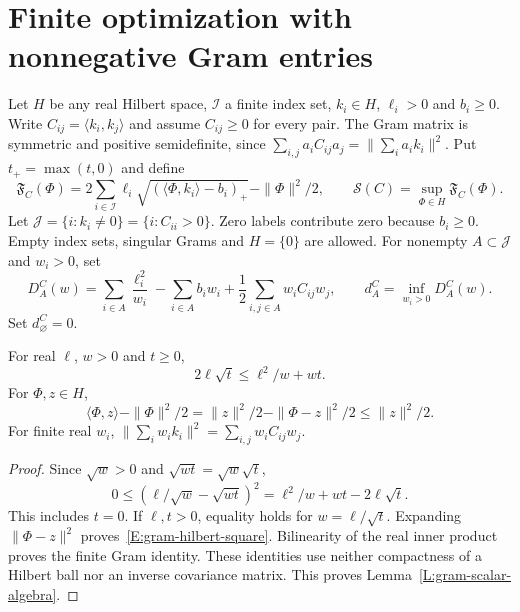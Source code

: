 \section{Finite optimization with nonnegative Gram entries}
\label{S:finite-positive-gram}

Let $H$ be any real Hilbert space, $\mathcal I$ a finite index set,
$k_i\in H$, $\ell_i>0$ and $b_i\ge0$.
Write $C_{ij}=\langle k_i,k_j\rangle$ and assume $C_{ij}\ge0$ for every
pair. The Gram matrix is symmetric and positive semidefinite, since
$\sum_{i,j}a_iC_{ij}a_j=\|\sum_i a_i k_i\|^2$.
Put $t_+=\max(t,0)$ and define
\begin{equation}\label{E:finite-gram-score}
  \mathfrak F_C(\Phi)
  =2\sum_{i\in\mathcal I}\ell_i
  \sqrt{(\langle\Phi,k_i\rangle-b_i)_+}-\|\Phi\|^2/2,
  \qquad \mathscr S(C)=\sup_{\Phi\in H}\mathfrak F_C(\Phi).
\end{equation}
Let $\mathcal J=\{i:k_i\ne0\}=\{i:C_{ii}>0\}$.
Zero labels contribute zero because $b_i\ge0$.
Empty index sets, singular Grams and $H=\{0\}$ are allowed.
For nonempty $A\subset\mathcal J$ and $w_i>0$, set
\begin{equation}\label{E:finite-gram-dual}
  D_A^C(w)=\sum_{i\in A}\frac{\ell_i^2}{w_i}
  -\sum_{i\in A}b_iw_i
  +\frac12\sum_{i,j\in A}w_iC_{ij}w_j,
  \qquad d_A^C=\inf_{w_i>0}D_A^C(w).
\end{equation}
Set $d_\varnothing^C=0$.

\begin{lemma}\label{L:gram-scalar-algebra}
  For real $\ell$, $w>0$ and $t\ge0$,
  \begin{equation}\label{E:gram-sqrt-dual}
    2\ell\sqrt t\le\ell^2/w+wt.
  \end{equation}
  For $\Phi,z\in H$,
  \begin{equation}\label{E:gram-hilbert-square}
    \langle\Phi,z\rangle-\|\Phi\|^2/2
    =\|z\|^2/2-\|\Phi-z\|^2/2\le\|z\|^2/2.
  \end{equation}
  For finite real $w_i$,
  $\|\sum_iw_ik_i\|^2=\sum_{i,j}w_iC_{ij}w_j$.
\end{lemma}

\begin{proof}
  Since $\sqrt w>0$ and $\sqrt{wt}=\sqrt w\sqrt t$,
  \[
    0\le(\ell/\sqrt w-\sqrt{wt})^2
    =\ell^2/w+wt-2\ell\sqrt t.
  \]
  This includes $t=0$. If $\ell,t>0$, equality holds for
  $w=\ell/\sqrt t$.
  Expanding $\|\Phi-z\|^2$ proves~\eqref{E:gram-hilbert-square}.
  Bilinearity of the real inner product proves the finite Gram identity.
  These identities use neither compactness of a Hilbert ball nor an
  inverse covariance matrix.
  This proves Lemma~\ref{L:gram-scalar-algebra}.
\end{proof}

